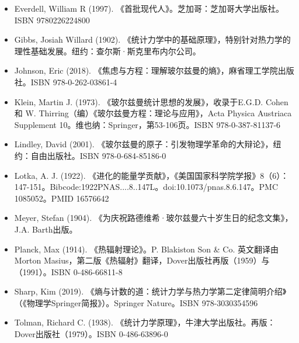 \begin{itemize}
\item Everdell, William R (1997). 《首批现代人》。芝加哥：芝加哥大学出版社。ISBN 9780226224800
\item Gibbs, Josiah Willard (1902). 《统计力学中的基础原理》，特别针对热力学的理性基础发展。纽约：查尔斯·斯克里布内尔公司。
\item Johnson, Eric (2018). 《焦虑与方程：理解玻尔兹曼的熵》，麻省理工学院出版社。ISBN 978-0-262-03861-4
\item Klein, Martin J. (1973). 《玻尔兹曼统计思想的发展》，收录于E.G.D. Cohen 和 W. Thirring（编）《玻尔兹曼方程：理论与应用》，Acta Physica Austriaca Supplement 10。维也纳：Springer，第53-106页。ISBN 978-0-387-81137-6
\item Lindley, David (2001). 《玻尔兹曼的原子：引发物理学革命的大辩论》，纽约：自由出版社。ISBN 978-0-684-85186-0
\item Lotka, A. J. (1922). 《进化的能量学贡献》，《美国国家科学院学报》8（6）：147-151。Bibcode:1922PNAS....8..147L。doi:10.1073/pnas.8.6.147。PMC 1085052。PMID 16576642
\item Meyer, Stefan (1904). 《为庆祝路德维希·玻尔兹曼六十岁生日的纪念文集》，J.A. Barth出版。
\item Planck, Max (1914). 《热辐射理论》。P. Blakiston Son & Co. 英文翻译由Morton Masius，第二版《热辐射》翻译，Dover出版社再版（1959）与（1991）。ISBN 0-486-66811-8
\item Sharp, Kim (2019). 《熵与计数的道：统计力学与热力学第二定律简明介绍》（《物理学Springer简报》）。Springer Nature。ISBN 978-3030354596
\item Tolman, Richard C. (1938). 《统计力学原理》，牛津大学出版社。再版：Dover出版社（1979）。ISBN 0-486-63896-0
\end{itemize}